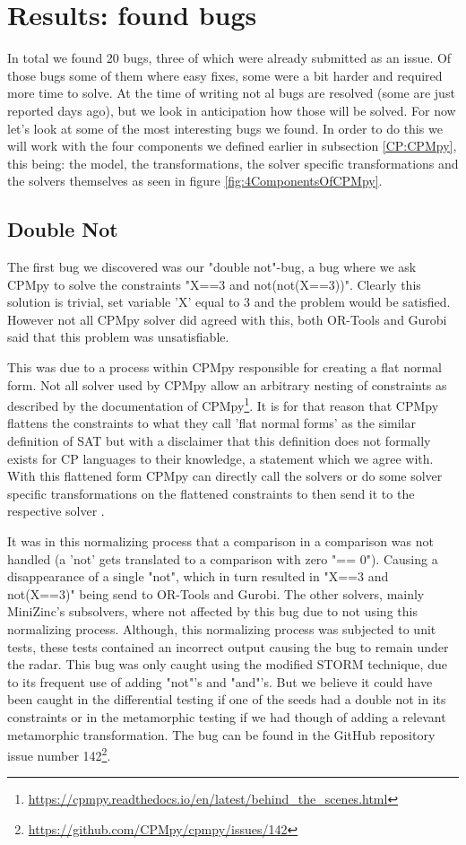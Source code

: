 \section{Results: found bugs}
\label{res:bugs}
In total we found 20 bugs, three of which were already submitted as an issue. Of those bugs some of them where easy fixes, some were a bit harder and required more time to solve. At the time of writing not al bugs are resolved (some are just reported days ago), but we look in anticipation how those will be solved. For now let's look at some of the most interesting bugs we found. In order to do this we will work with the four components we defined earlier in subsection \ref{CP:CPMpy}, this being: the model, the transformations, the solver specific transformations and the solvers themselves as seen in figure \ref{fig:4ComponentsOfCPMpy}.


\subsection{Double Not}
\label{res:bug:DoubleNot}
The first bug we discovered was our "double not"-bug, a bug where we ask CPMpy to solve the constraints "X==3 and not(not(X==3))". Clearly this solution is trivial, set variable 'X' equal to 3 and the problem would be satisfied. However not all CPMpy solver did agreed with this, both OR-Tools and Gurobi said that this problem was unsatisfiable. 

This was due to a process within CPMpy responsible for creating a flat normal form. Not all solver used by CPMpy allow an arbitrary nesting of constraints as described by the documentation of CPMpy\footnote{\url{https://cpmpy.readthedocs.io/en/latest/behind_the_scenes.html}}. It is for that reason that CPMpy flattens the constraints to what they call 'flat normal forms' as the similar definition of SAT but with a disclaimer that this definition does not formally exists for CP languages to their knowledge, a statement which we agree with. With this flattened form CPMpy can directly call the solvers or do some solver specific transformations on the flattened constraints to then send it to the respective solver \cite{CPMpyGithub}. 

It was in this normalizing process that a comparison in a comparison was not handled (a 'not' gets translated to a comparison with zero "== 0"). Causing a disappearance of a single "not", which in turn resulted in "X==3 and not(X==3)" being send to OR-Tools and Gurobi. The other solvers, mainly MiniZinc's subsolvers, where not affected by this bug due to not using this normalizing process. Although, this normalizing process was subjected to unit tests, these tests contained an incorrect output causing the bug to remain under the radar. This bug was only caught using the modified STORM technique, due to its frequent use of adding "not"'s and "and"'s. But we believe it could have been caught in the differential testing if one of the seeds had a double not in its constraints or in the metamorphic testing if we had though of adding a relevant metamorphic transformation. The bug can be found in the GitHub repository issue number  142\footnote{\url{https://github.com/CPMpy/cpmpy/issues/142}}.

